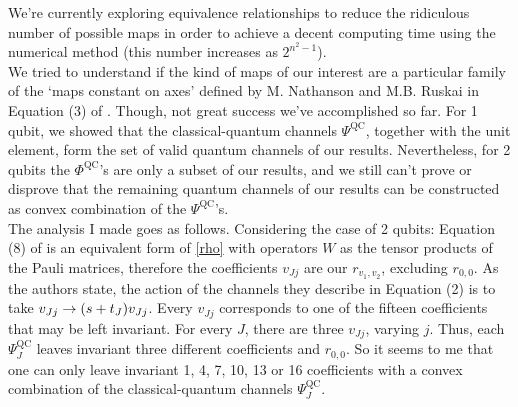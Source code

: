\documentclass[11pt]{article}
\begin{document}
We're currently exploring equivalence relationships to reduce the ridiculous number of possible maps in order to achieve a
decent computing time using the numerical method (this number increases as $2^{n^2-1}$). \\ 

We tried to understand if the kind of maps of our interest are a particular family of the `maps constant on axes' defined by M.
Nathanson and M.B. Ruskai in Equation (3) of \cite{nathanson2007pauli}. Though, not great success we've accomplished so far.
For 1 qubit, we showed that the classical-quantum channels $\Psi ^{\text{QC}}$, together with the unit element, form the set
of valid quantum channels of our results. Nevertheless, for 2 qubits the $\Phi ^{\text{QC}}$'s are only a subset of our results,
and we still can't prove or disprove that the remaining quantum channels of our results can be constructed as convex
combination of the $\Psi ^{\text{QC}}$'s.\\

The analysis I made goes as follows. Considering the case of 2 qubits: Equation (8) of \cite{nathanson2007pauli} is an
equivalent form of \eqref{rho} with operators $W$ as the tensor products of the Pauli matrices, therefore the coefficients
$v_{Jj}$ are our $r_{v_1,v_2}$, excluding $r_{0,0}$. As the authors state, the action of the channels they describe in Equation (2)
is to take $v_{Jj}\to \qty(s+t_J)v_{Jj}$. Every $v_{Jj}$ corresponds to one of the fifteen coefficients that may be left invariant.
For every $J$, there are three $v_{Jj}$, varying $j$. Thus, each $\Psi ^{\text{QC}}_J$ leaves invariant three different
coefficients and $r_{0,0}$. So it seems to me that one can only leave invariant 1, 4, 7, 10, 13 or 16 coefficients with a convex
combination of the classical-quantum channels $\Psi ^{\text{QC}}_J$.



\end{document}
